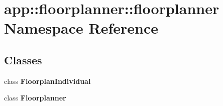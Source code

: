 \section{app::floorplanner::floorplanner Namespace Reference}
\label{namespaceapp_1_1floorplanner_1_1floorplanner}


\subsection*{Classes}
\begin{CompactItemize}
\item 
class {\bf FloorplanIndividual}
\item 
class {\bf Floorplanner}
\end{CompactItemize}
